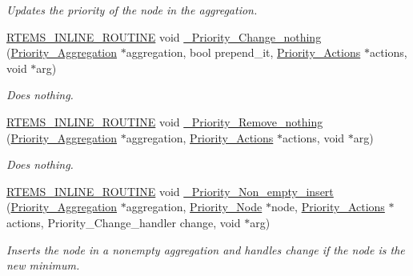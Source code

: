 \begin{DoxyCompactItemize}
\begin{DoxyCompactList}\small\item\em Updates the priority of the node in the aggregation. \end{DoxyCompactList}\item 
\mbox{\hyperlink{group__RTEMSScoreBaseDefs_gac216239df231d5dbd15e3520b0b9313f}{R\+T\+E\+M\+S\+\_\+\+I\+N\+L\+I\+N\+E\+\_\+\+R\+O\+U\+T\+I\+NE}} void \mbox{\hyperlink{group__RTEMSScorePriority_ga376808ed1ec1863f949b35f8dbabaea5}{\+\_\+\+Priority\+\_\+\+Change\+\_\+nothing}} (\mbox{\hyperlink{structPriority__Aggregation}{Priority\+\_\+\+Aggregation}} $\ast$aggregation, bool prepend\+\_\+it, \mbox{\hyperlink{structPriority__Actions}{Priority\+\_\+\+Actions}} $\ast$actions, void $\ast$arg)
\begin{DoxyCompactList}\small\item\em Does nothing. \end{DoxyCompactList}\item 
\mbox{\hyperlink{group__RTEMSScoreBaseDefs_gac216239df231d5dbd15e3520b0b9313f}{R\+T\+E\+M\+S\+\_\+\+I\+N\+L\+I\+N\+E\+\_\+\+R\+O\+U\+T\+I\+NE}} void \mbox{\hyperlink{group__RTEMSScorePriority_ga5992ef5ea71b1219fe7a884e0ccc52af}{\+\_\+\+Priority\+\_\+\+Remove\+\_\+nothing}} (\mbox{\hyperlink{structPriority__Aggregation}{Priority\+\_\+\+Aggregation}} $\ast$aggregation, \mbox{\hyperlink{structPriority__Actions}{Priority\+\_\+\+Actions}} $\ast$actions, void $\ast$arg)
\begin{DoxyCompactList}\small\item\em Does nothing. \end{DoxyCompactList}\item 
\mbox{\hyperlink{group__RTEMSScoreBaseDefs_gac216239df231d5dbd15e3520b0b9313f}{R\+T\+E\+M\+S\+\_\+\+I\+N\+L\+I\+N\+E\+\_\+\+R\+O\+U\+T\+I\+NE}} void \mbox{\hyperlink{group__RTEMSScorePriority_ga73b5cce2b5df3b31ab208e64cc0348a9}{\+\_\+\+Priority\+\_\+\+Non\+\_\+empty\+\_\+insert}} (\mbox{\hyperlink{structPriority__Aggregation}{Priority\+\_\+\+Aggregation}} $\ast$aggregation, \mbox{\hyperlink{structPriority__Node}{Priority\+\_\+\+Node}} $\ast$node, \mbox{\hyperlink{structPriority__Actions}{Priority\+\_\+\+Actions}} $\ast$actions, Priority\+\_\+\+Change\+\_\+handler change, void $\ast$arg)
\begin{DoxyCompactList}\small\item\em Inserts the node in a nonempty aggregation and handles change if the node is the new minimum. \end{DoxyCompactList}\item 

\end{DoxyCompactItemize}
